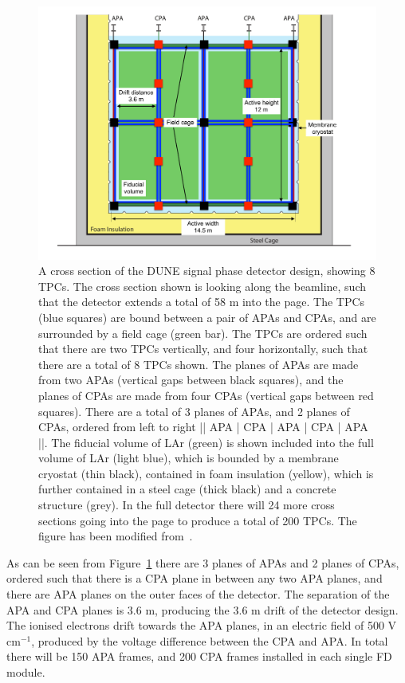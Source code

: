 \begin{figure}
  \centering
  \includegraphics[width=\textwidth]{FarDetectorSchem}
  \caption[A cross section of the DUNE single phase detector design, showing 8 TPCs]
          {A cross section of the DUNE signal phase detector design, showing 8 TPCs. The cross section shown is looking along the beamline, such that the detector extends a total of 58 m into the page. The TPCs (blue squares) are bound between a pair of APAs and CPAs, and are surrounded by a field cage (green bar). The TPCs are ordered such that there are two TPCs vertically, and four horizontally, such that there are a total of 8 TPCs shown. The planes of APAs are made from two APAs (vertical gaps between black squares), and the planes of CPAs are made from four CPAs (vertical gaps between red squares). There are a total of 3 planes of APAs, and 2 planes of CPAs, ordered from left to right || APA | CPA | APA | CPA | APA ||. The fiducial volume of LAr (green) is shown included into the full volume of LAr (light blue), which is bounded by a membrane cryostat (thin black), contained in foam insulation (yellow), which is further contained in a steel cage (thick black) and a concrete structure (grey). In the full detector there will 24 more cross sections going into the page to produce a total of 200 TPCs. The figure has been modified from~\citep{DUNECDR_V4}.}
  \label{fig:DUNE_SP_Schem}
\end{figure}

As can be seen from Figure~\ref{fig:DUNE_SP_Schem} there are 3 planes of APAs and 2 planes of CPAs, ordered such that there is a CPA plane in between any two APA planes, and there are APA planes on the outer faces of the detector. The separation of the APA and CPA planes is 3.6 m, producing the 3.6 m drift of the detector design. The ionised electrons drift towards the APA planes, in an electric field of 500 V cm$^{-1}$, produced by the voltage difference between the CPA and APA. In total there will be 150 APA frames, and 200 CPA frames installed in each single FD module. \\

